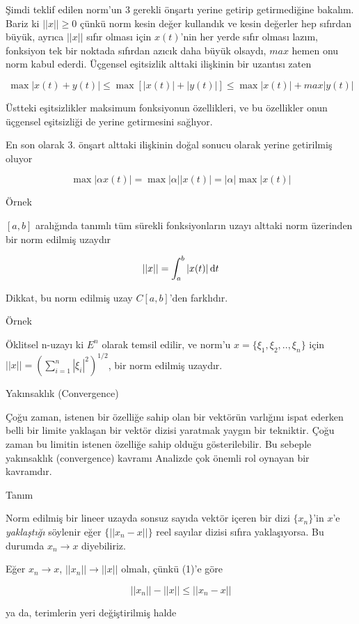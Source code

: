 \documentclass[12pt,fleqn]{article}\usepackage{../../common}
\begin{document}
Şimdi teklif edilen norm'un 3 gerekli önşartı yerine getirip getirmediğine
bakalım. Bariz ki $||x|| \ge 0$ çünkü norm kesin değer kullandık ve kesin
değerler hep sıfırdan büyük, ayrıca $||x||$ sıfır olması için $x(t)$'nin
her yerde sıfır olması lazım, fonksiyon tek bir noktada sıfırdan azıcık
daha büyük olsaydı, $max$ hemen onu norm kabul ederdi. Üçgensel eşitsizlik
alttaki ilişkinin bir uzantısı zaten

$$ 
\max |x(t) + y(t)| \le 
\max [|x(t)| + |y(t)|] \le
\max |x(t)| + max |y(t)|
$$

Üstteki eşitsizlikler maksimum fonksiyonun özellikleri, ve bu özellikler
onun üçgensel eşitsizliği de yerine getirmesini sağlıyor. 

En son olarak 3. önşart alttaki ilişkinin doğal sonucu olarak yerine
getirilmiş oluyor 

$$ \max |\alpha x(t)|  = \max |\alpha||x(t)| = |\alpha| \max |x(t)|  $$

Örnek

$[a,b]$ aralığında tanımlı tüm sürekli fonksiyonların uzayı alttaki norm
üzerinden bir norm edilmiş uzaydır

$$ ||x|| = \int _{ a}^{b} |x(t)| \,\mathrm{d} t $$

Dikkat, bu norm edilmiş uzay $C[a,b]$'den farklıdır. 

Örnek 

Öklitsel n-uzayı ki $E^n$ olarak temsil edilir, ve norm'u $x = \{ \xi_1,
\xi_2, .., \xi_n\}$ için $||x|| = (\sum _{ i=1}^{n} |\xi_i|^2)^{1/2}$, bir
norm edilmiş uzaydır.

Yakınsaklık (Convergence)

Çoğu zaman, istenen bir özelliğe sahip olan bir vektörün varlığını ispat
ederken belli bir limite yaklaşan bir vektör dizisi yaratmak yaygın bir
tekniktir. Çoğu zaman bu limitin istenen özelliğe sahip olduğu
gösterilebilir. Bu sebeple yakınsaklık (convergence) kavramı Analizde çok
önemli rol oynayan bir kavramdır.

Tanım 

Norm edilmiş bir lineer uzayda sonsuz sayıda vektör içeren bir dizi
$\{x_n\}$'in $x$'e {\em yaklaştığı} söylenir eğer $\{||x_n-x||\}$ reel
sayılar dizisi sıfıra yaklaşıyorsa. Bu durumda $x_n \to x$ diyebiliriz.

Eğer $x_n \to x$, $||x_n|| \to ||x||$ olmalı, çünkü (1)'e göre 

$$ ||x_n||  - ||x|| \le ||x_n-x|| $$

ya da, terimlerin yeri değiştirilmiş halde
\end{document}
